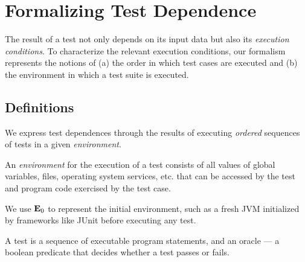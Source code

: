 
\section{Formalizing Test Dependence}
\label{sec:formalism}


The result of a test not only depends on
its input data but also its \emph{execution conditions}.
To characterize the relevant execution conditions, 
our formalism represents the notions of
(a) the order in which test cases are executed and (b) the environment in which a test suite is executed.  


\subsection{Definitions}
\label{sec:definitions}

We express test dependences through the results of executing
\emph{ordered} sequences of tests in a given \emph{environment}.


\begin{definition}[Environment]
An \emph{environment} \env for the execution of a test
consists of all values of global variables, files,
operating
system services, etc. that
can be accessed by the test and program code exercised by the test
case.
\end{definition}

We use $\mathbf{E}_0$ to represent the initial environment, such
as a fresh JVM initialized by frameworks like JUnit
before executing any test.


\begin{definition}[Test]

A test is a sequence of executable program statements, and an oracle
--- a boolean predicate that
decides whether a test passes or fails.
\end{definition}



